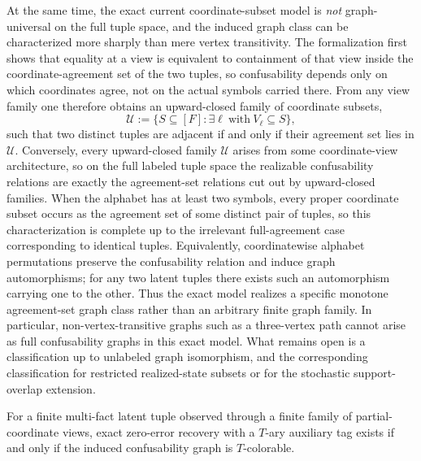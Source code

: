 At the same time, the exact current coordinate-subset model is \emph{not} graph-universal on the full tuple space, and the induced graph class can be characterized more sharply than mere vertex transitivity. The formalization first shows that equality at a view is equivalent to containment of that view inside the coordinate-agreement set of the two tuples, so confusability depends only on which coordinates agree, not on the actual symbols carried there. From any view family one therefore obtains an upward-closed family of coordinate subsets,
\[
\mathcal U := \{S \subseteq [F] : \exists \ell\ \text{with}\ V_\ell \subseteq S\},
\]
such that two distinct tuples are adjacent if and only if their agreement set lies in $\mathcal U$. Conversely, every upward-closed family $\mathcal U$ arises from some coordinate-view architecture, so on the full labeled tuple space the realizable confusability relations are exactly the agreement-set relations cut out by upward-closed families. When the alphabet has at least two symbols, every proper coordinate subset occurs as the agreement set of some distinct pair of tuples, so this characterization is complete up to the irrelevant full-agreement case corresponding to identical tuples. Equivalently, coordinatewise alphabet permutations preserve the confusability relation and induce graph automorphisms; for any two latent tuples there exists such an automorphism carrying one to the other. Thus the exact model realizes a specific monotone agreement-set graph class rather than an arbitrary finite graph family. In particular, non-vertex-transitive graphs such as a three-vertex path cannot arise as full confusability graphs in this exact model. What remains open is a classification up to unlabeled graph isomorphism, and the corresponding classification for restricted realized-state subsets or for the stochastic support-overlap extension.

\begin{theorem}\label{thm:multifact-colorability}
For a finite multi-fact latent tuple observed through a finite family of partial-coordinate views, exact zero-error recovery with a $T$-ary auxiliary tag exists if and only if the induced confusability graph is $T$-colorable.
\end{theorem}

